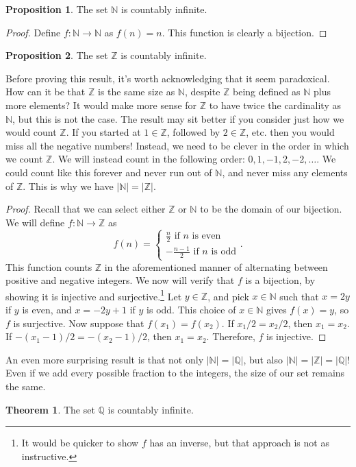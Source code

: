 \documentclass{article}
\newcommand{\N}{\mathbb{N}}
\newcommand{\Q}{\mathbb{Q}}
\newcommand{\Z}{\mathbb{Z}}
\theoremstyle{definition}
\newtheorem{proposition}{Proposition}[section]
\newtheorem{theorem}{Theorem}[section]
\begin{document}
	\begin{proposition}
		The set $ \N $ is countably infinite.
	\end{proposition}
	\begin{proof}
		Define $ f:\N\to\N $ as $ f(n)=n $. This function is clearly a bijection. 
	\end{proof}
	\begin{proposition}
		The set $ \Z $ is countably infinite.
	\end{proposition}
	Before proving this result, it's worth acknowledging that it seem paradoxical. How can it be that $ \Z $ is the same size as $ \N $, despite $ \Z $ being defined as $ \N $ plus more elements? It would make more sense for $ \Z $ to have twice the cardinality as $ \N $, but this is not the case. The result may sit better if you consider just how we would count $ \Z $. If you started at $ 1\in\Z $, followed by $ 2\in\Z $, etc. then you would miss all the negative numbers! Instead, we need to be clever in the order in which we count $ \Z $. We will instead count in the following order: $ 0,1,-1,2,-2,\ldots $. We could count like this forever and never run out of $ \N $, and never miss any elements of $ \Z $. This is why we have $ |\N|=|\Z| $. 
	\begin{proof}
		Recall that we can select either $ \Z $ or $ \N $ to be the domain of our bijection. We will define $ f:\N\to\Z $ as
		$$f(n)=\begin{cases}
			\frac{n}{2}\text{ if }n\text{ is even}\\
			-\frac{n-1}{2}\text{ if }n\text{ is odd}
		\end{cases}.$$
		This function counts $ \Z $ in the aforementioned manner of alternating between positive and negative integers. We now will verify that $ f $ is a bijection, by showing it is injective and surjective.\footnote{It would be quicker to show $ f $ has an inverse, but that approach is not as instructive.} Let $ y\in\Z $, and pick $ x\in\N $ such that $ x=2y $ if $ y $ is even, and $ x=-2y+1 $ if $ y $ is odd. This choice of $ x\in\N $ gives $ f(x)=y $, so $ f $ is surjective. Now suppose that $ f(x_1)=f(x_2) $. If $ x_1/2=x_2/2 $, then $ x_1=x_2 $. If $ -(x_1-1)/2=-(x_2-1)/2 $, then $ x_1=x_2 $. Therefore, $ f $ is injective.
	\end{proof}
	An even more surprising result is that not only $ |\N|=|\Q| $, but also $ |\N|=|\Z|=|\Q| $! Even if we add every possible fraction to the integers, the size of our set remains the same.
	\begin{theorem}
		The set $ \Q $ is countably infinite. 
	\end{theorem}
	
\end{document}
